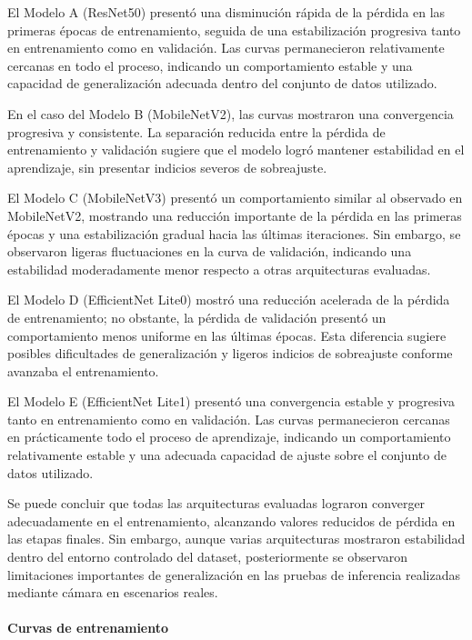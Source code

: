 	El Modelo A (ResNet50) presentó una disminución rápida de la pérdida en las primeras épocas de entrenamiento, seguida de una estabilización progresiva tanto en entrenamiento como en validación. Las curvas permanecieron relativamente cercanas en todo el proceso, indicando un comportamiento estable y una capacidad de generalización adecuada dentro del conjunto de datos utilizado.
	
	En el caso del Modelo B (MobileNetV2), las curvas mostraron una convergencia progresiva y consistente. La separación reducida entre la pérdida de entrenamiento y validación sugiere que el modelo logró mantener estabilidad en el aprendizaje, sin presentar indicios severos de sobreajuste.
	
	El Modelo C (MobileNetV3) presentó un comportamiento similar al observado en MobileNetV2, mostrando una reducción importante de la pérdida en las primeras épocas y una estabilización gradual hacia las últimas iteraciones. Sin embargo, se observaron ligeras fluctuaciones en la curva de validación, indicando una estabilidad moderadamente menor respecto a otras arquitecturas evaluadas.
	
	El Modelo D (EfficientNet Lite0) mostró una reducción acelerada de la pérdida de entrenamiento; no obstante, la pérdida de validación presentó un comportamiento menos uniforme en las últimas épocas. Esta diferencia sugiere posibles dificultades de generalización y ligeros indicios de sobreajuste conforme avanzaba el entrenamiento.
	
	El Modelo E (EfficientNet Lite1) presentó una convergencia estable y progresiva tanto en entrenamiento como en validación. Las curvas permanecieron cercanas en prácticamente todo el proceso de aprendizaje, indicando un comportamiento relativamente estable y una adecuada capacidad de ajuste sobre el conjunto de datos utilizado.
	
	Se puede concluir que todas las arquitecturas evaluadas lograron converger adecuadamente en el entrenamiento, alcanzando valores reducidos de pérdida en las etapas finales. Sin embargo, aunque varias arquitecturas mostraron estabilidad dentro del entorno controlado del dataset, posteriormente se observaron limitaciones importantes de generalización en las pruebas de inferencia realizadas mediante cámara en escenarios reales.

	\paragraph{Curvas de entrenamiento}
	
